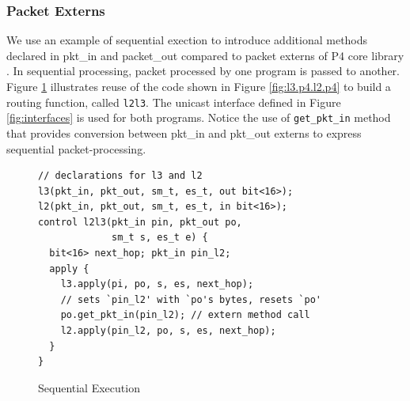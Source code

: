 \documentclass{hotnets19}
\begin{document}
\subsubsection{Packet Externs}
We use an example of sequential exection to introduce additional methods declared in pkt\_in and packet\_out compared to packet externs of P4 core library \cite{core.p4}.
In sequential processing, packet processed by one program is passed to another.
Figure \ref{fig:sequential-execution} illustrates reuse of the code shown in Figure \ref{fig:l3.p4.l2.p4} to build a routing function, called \texttt{l2l3}.
The unicast interface defined in Figure \ref{fig:interfaces} is used for both programs.
Notice the use of \texttt{get\_pkt\_in} method that provides conversion between pkt\_in and pkt\_out externs to express sequential packet-processing.
\begin{figure}
\begin{lstlisting}[frame=none]
// declarations for l3 and l2
l3(pkt_in, pkt_out, sm_t, es_t, out bit<16>);
l2(pkt_in, pkt_out, sm_t, es_t, in bit<16>);
control l2l3(pkt_in pin, pkt_out po, 
             sm_t s, es_t e) {
  bit<16> next_hop; pkt_in pin_l2;
  apply {
    l3.apply(pi, po, s, es, next_hop);
    // sets `pin_l2' with `po's bytes, resets `po'
    po.get_pkt_in(pin_l2); // extern method call
    l2.apply(pin_l2, po, s, es, next_hop);
  }
}
\end{lstlisting}
\caption{Sequential Execution}
\label{fig:sequential-execution}
\end{figure}
\end{document}

